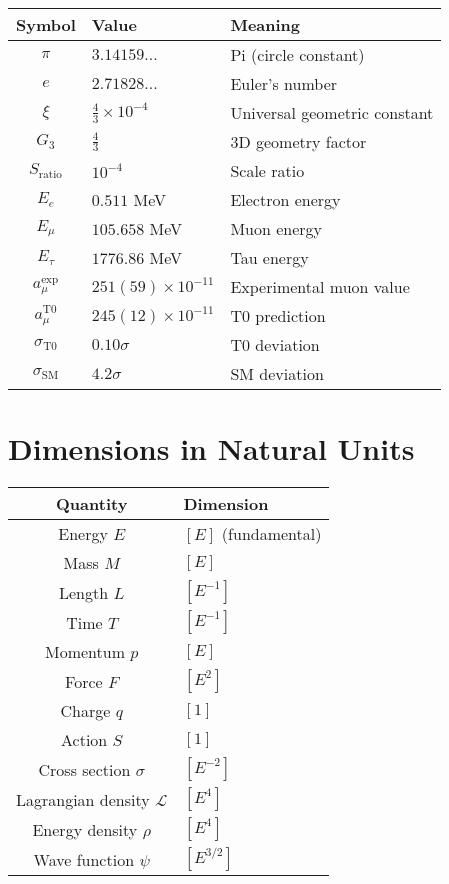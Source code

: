 \documentclass[12pt,a4paper]{report}
\begin{document}
\begin{longtable}{|c|l|l|}
	\hline
	\textbf{Symbol} & \textbf{Value} & \textbf{Meaning} \\
	\hline
	$\pi$ & $3.14159...$ & Pi (circle constant) \\
	$e$ & $2.71828...$ & Euler's number \\
	$\xi$ & $\frac{4}{3} \times 10^{-4}$ & Universal geometric constant \\
	$G_3$ & $\frac{4}{3}$ & 3D geometry factor \\
	$S_{\text{ratio}}$ & $10^{-4}$ & Scale ratio \\
	$E_e$ & $0.511$ MeV & Electron energy \\
	$E_\mu$ & $105.658$ MeV & Muon energy \\
	$E_\tau$ & $1776.86$ MeV & Tau energy \\
	$a_\mu^{\text{exp}}$ & $251(59) \times 10^{-11}$ & Experimental muon value \\
	$a_\mu^{\text{T0}}$ & $245(12) \times 10^{-11}$ & T0 prediction \\
	$\sigma_{\text{T0}}$ & $0.10\sigma$ & T0 deviation \\
	$\sigma_{\text{SM}}$ & $4.2\sigma$ & SM deviation \\
	\hline
\end{longtable}

\section{Dimensions in Natural Units}
\label{sec:dimensions_natural_units}

\begin{longtable}{|c|l|}
	\hline
	\textbf{Quantity} & \textbf{Dimension} \\
	\hline
	Energy $E$ & $[E]$ (fundamental) \\
	Mass $M$ & $[E]$ \\
	Length $L$ & $[E^{-1}]$ \\
	Time $T$ & $[E^{-1}]$ \\
	Momentum $p$ & $[E]$ \\
	Force $F$ & $[E^2]$ \\
	Charge $q$ & $[1]$ \\
	Action $S$ & $[1]$ \\
	Cross section $\sigma$ & $[E^{-2}]$ \\
	Lagrangian density $\mathcal{L}$ & $[E^4]$ \\
	Energy density $\rho$ & $[E^4]$ \\
	Wave function $\psi$ & $[E^{3/2}]$ \\
	\hline
\end{longtable}
\end{document}

